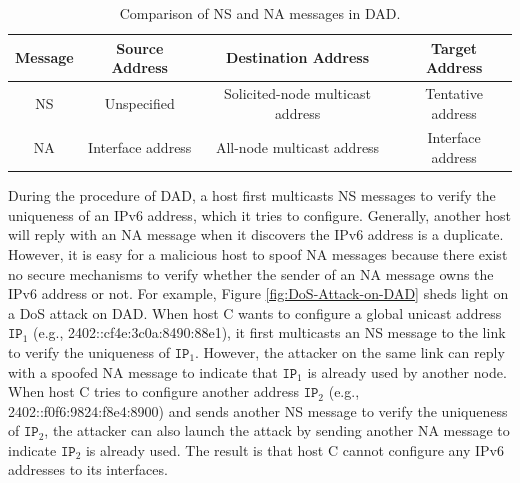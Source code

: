 \documentclass[journal]{IEEEtran}
\begin{document}
        \begin{table}
            \centering
            \caption{Comparison of NS and NA messages in DAD.}
            \begin{tabular}{|c||c|c|c|}
                \hline
                \textbf{Message} & \textbf{Source Address} & \textbf{Destination Address} & \textbf{Target Address} \\
                \hline
                \hline
                NS & Unspecified & Solicited-node multicast address & Tentative address \\
                \hline
                NA & Interface address & All-node multicast address & Interface address \\
                \hline
            \end{tabular}
            \label{tab:DAD}
        \end{table}

        During the procedure of DAD, a host first multicasts NS messages to verify the uniqueness of an IPv6 address, which it tries to configure. Generally, another host will reply with an NA message when it discovers the IPv6 address is a duplicate. However, it is easy for a malicious host to spoof NA messages because there exist no secure mechanisms to verify whether the sender of an NA message owns the IPv6 address or not. For example, Figure \ref{fig:DoS-Attack-on-DAD} sheds light on a DoS attack on DAD. When host C wants to configure a global unicast address $\mathtt{IP}_1$ (e.g., 2402::cf4e:3c0a:8490:88e1), it first multicasts an NS message to the link to verify the uniqueness of $\mathtt{IP}_1$. However, the attacker on the same link can reply with a spoofed NA message to indicate that $\mathtt{IP}_1$ is already used by another node. When host C tries to configure another address $\mathtt{IP}_2$ (e.g., 2402::f0f6:9824:f8e4:8900) and sends another NS message to verify the uniqueness of $\mathtt{IP}_2$, the attacker can also launch the attack by sending another NA message to indicate $\mathtt{IP}_2$ is already used. The result is that host C cannot configure any IPv6 addresses to its interfaces.
\end{document}
